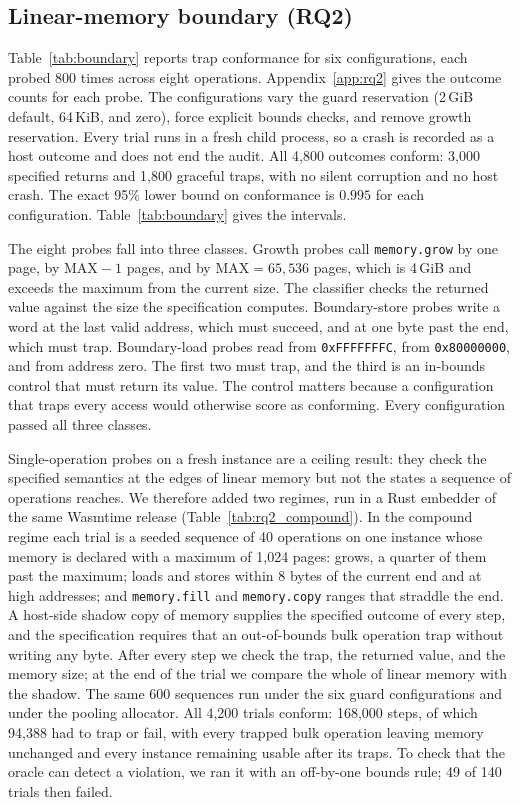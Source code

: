\documentclass{ws-jcsc}
\begin{document}
\subsection{Linear-memory boundary (RQ2)}
\label{sec:rq2}
Table~\ref{tab:boundary} reports trap conformance for six configurations, each probed 800 times across eight operations. Appendix~\ref{app:rq2} gives the outcome counts for each probe. The configurations vary the guard reservation (2\,GiB default, 64\,KiB, and zero), force explicit bounds checks, and remove growth reservation. Every trial runs in a fresh child process, so a crash is recorded as a host outcome and does not end the audit. All 4{,}800 outcomes conform: 3{,}000 specified returns and 1{,}800 graceful traps, with no silent corruption and no host crash. The exact 95\% lower bound on conformance is $0.995$ for each configuration. Table~\ref{tab:boundary} gives the intervals.

The eight probes fall into three classes. Growth probes call \texttt{memory.grow} by one page, by $\mathrm{MAX}-1$ pages, and by $\mathrm{MAX}=65{,}536$ pages, which is 4\,GiB and exceeds the maximum from the current size. The classifier checks the returned value against the size the specification computes. Boundary-store probes write a word at the last valid address, which must succeed, and at one byte past the end, which must trap. Boundary-load probes read from \texttt{0xFFFFFFFC}, from \texttt{0x80000000}, and from address zero. The first two must trap, and the third is an in-bounds control that must return its value. The control matters because a configuration that traps every access would otherwise score as conforming. Every configuration passed all three classes.

Single-operation probes on a fresh instance are a ceiling result: they check the specified semantics at the edges of linear memory but not the states a sequence of operations reaches. We therefore added two regimes, run in a Rust embedder of the same Wasmtime release (Table~\ref{tab:rq2_compound}). In the compound regime each trial is a seeded sequence of 40 operations on one instance whose memory is declared with a maximum of 1{,}024 pages: grows, a quarter of them past the maximum; loads and stores within 8 bytes of the current end and at high addresses; and \texttt{memory.fill} and \texttt{memory.copy} ranges that straddle the end. A host-side shadow copy of memory supplies the specified outcome of every step, and the specification requires that an out-of-bounds bulk operation trap without writing any byte. After every step we check the trap, the returned value, and the memory size; at the end of the trial we compare the whole of linear memory with the shadow. The same 600 sequences run under the six guard configurations and under the pooling allocator. All 4{,}200 trials conform: 168{,}000 steps, of which 94{,}388 had to trap or fail, with every trapped bulk operation leaving memory unchanged and every instance remaining usable after its traps. To check that the oracle can detect a violation, we ran it with an off-by-one bounds rule; 49 of 140 trials then failed.
\end{document}
